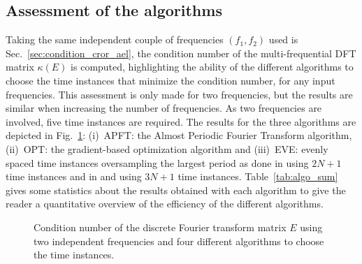 \subsection{Assessment of the algorithms}
Taking the same independent couple of frequencies $(f_1, f_2)$
used is Sec.~\ref{sec:condition_cror_ael}, the condition number of the
multi-frequential DFT matrix $\kappa (E)$ is computed, highlighting
the ability of the different algorithms to choose the time instances that
minimize the condition number, for any input frequencies. This
assessment is only made for two frequencies, but the results are similar
when increasing the number of frequencies. As two frequencies are
involved, five time instances are required. The results for the three
algorithms are depicted in Fig.~\ref{fig:bench_algo}: (i)~APFT: the
Almost Periodic Fourier Transform algorithm, (ii)~OPT: the
gradient-based optimization algorithm and (iii)~EVE: evenly spaced
time instances oversampling the largest period as done in
\citet{Gopinath2007} using $2N+1$ time
instances and in \citet{Ekici2007} and \citet{Ekici2008} using $3N+1$
time instances.
Table~\ref{tab:algo_sum} gives some statistics about the results obtained
with each algorithm to give the reader a quantitative overview of the
efficiency of the different algorithms.
\begin{figure}[htp]
  \centering 
  \caption{Condition number of the discrete Fourier transform matrix $E$
  using two independent frequencies and four different algorithms
  to choose the time instances.}
  \label{fig:bench_algo}
\end{figure}


